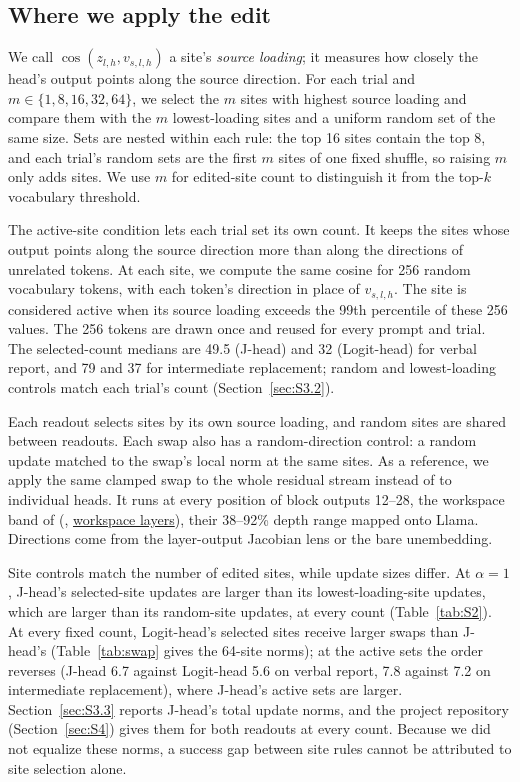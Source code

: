\documentclass[11pt,a4paper]{article}
\begin{document}
\subsection{Where we apply the edit}\label{sec:4.3}

We call $\cos(z_{l,h},v_{s,l,h})$ a site's \emph{source loading}; it measures how closely the head's output points along the source direction. For each trial and $m\in\{1,8,16,32,64\}$, we select the $m$ sites with highest source loading and compare them with the $m$ lowest-loading sites and a uniform random set of the same size. Sets are nested within each rule: the top 16 sites contain the top 8, and each trial's random sets are the first $m$ sites of one fixed shuffle, so raising $m$ only adds sites. We use $m$ for edited-site count to distinguish it from the top-$k$ vocabulary threshold.

The active-site condition lets each trial set its own count. It keeps the sites whose output points along the source direction more than along the directions of unrelated tokens. At each site, we compute the same cosine for 256 random vocabulary tokens, with each token's direction in place of $v_{s,l,h}$. The site is considered active when its source loading exceeds the 99th percentile of these 256 values. The 256 tokens are drawn once and reused for every prompt and trial. The selected-count medians are 49.5 (J-head) and 32 (Logit-head) for verbal report, and 79 and 37 for intermediate replacement; random and lowest-loading controls match each trial's count (Section~\ref{sec:S3.2}).

Each readout selects sites by its own source loading, and random sites are shared between readouts. Each swap also has a random-direction control: a random update matched to the swap's local norm at the same sites. As a reference, we apply the same clamped swap to the whole residual stream instead of to individual heads. It runs at every position of block outputs 12--28, the workspace band of \citeauthor{gurnee2026} (\citeyear{gurnee2026}, \href{https://transformer-circuits.pub/2026/workspace/\#struct-layers}{workspace layers}), their 38--92\% depth range mapped onto Llama. Directions come from the layer-output Jacobian lens or the bare unembedding.

Site controls match the number of edited sites, while update sizes differ. At $\alpha=1$, J-head's selected-site updates are larger than its lowest-loading-site updates, which are larger than its random-site updates, at every count (Table~\ref{tab:S2}). At every fixed count, Logit-head's selected sites receive larger swaps than J-head's (Table~\ref{tab:swap} gives the 64-site norms); at the active sets the order reverses (J-head 6.7 against Logit-head 5.6 on verbal report, 7.8 against 7.2 on intermediate replacement), where J-head's active sets are larger. Section~\ref{sec:S3.3} reports J-head's total update norms, and the project repository (Section~\ref{sec:S4}) gives them for both readouts at every count. Because we did not equalize these norms, a success gap between site rules cannot be attributed to site selection alone.
\end{document}
